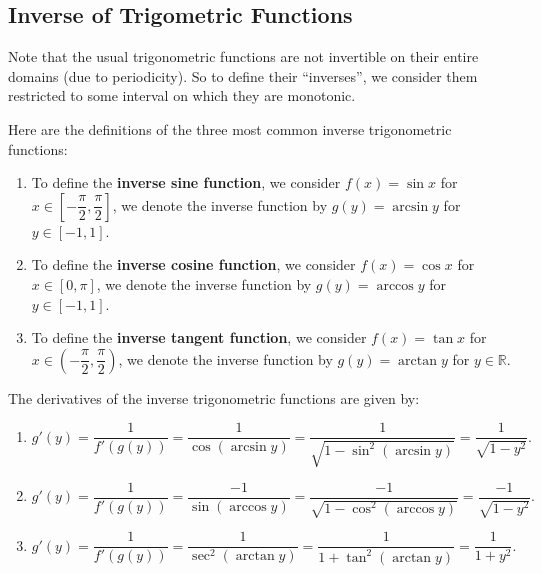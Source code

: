 \documentclass[a4paper]{ctexart}
\begin{document}
    \subsection{Inverse of Trigometric Functions}
    Note that the usual trigonometric functions are not invertible on their entire domains (due to periodicity).  So to define their ``inverses'', we consider them restricted to some interval on which they are monotonic.
    \begin{mydef}
        Here are the definitions of the three most common inverse trigonometric functions:
        \begin{enumerate}
            \item To define the \textbf{inverse sine function}, we consider $f(x)=\sin x$ for $x \in \left[-\dfrac{\pi}{2}, \dfrac{\pi}{2}\right]$, we denote the inverse function by $g(y)=\arcsin y$ for $y \in [-1,1]$.
            \item To define the \textbf{inverse cosine function}, we consider $f(x)=\cos x$ for $x \in [0, \pi]$, we denote the inverse function by $g(y)=\arccos y$ for $y \in [-1,1]$.
            \item To define the \textbf{inverse tangent function}, we consider $f(x)=\tan x$ for $x \in \left(-\dfrac{\pi}{2}, \dfrac{\pi}{2}\right)$, we denote the inverse function by $g(y)=\arctan y$ for $y \in \mathbb{R}$.
        \end{enumerate}
    \end{mydef}
    \begin{mythm}
        The derivatives of the inverse trigonometric functions are given by:
        \begin{enumerate}
            \item [(1)]
            \[
            g'(y) = \dfrac{1}{f'(g(y))} = \frac{1}{\cos(\arcsin y)} = \frac{1}{\sqrt{1-\sin^2(\arcsin y)}} = \frac{1}{\sqrt{1-y^2}}.
            \]
            \item [(2)]
            \[
            g'(y) = \dfrac{1}{f'(g(y))} = \frac{-1}{\sin(\arccos y)} = \frac{-1}{\sqrt{1-\cos^2(\arccos y)}} = \frac{-1}{\sqrt{1-y^2}}.
            \]
            \item [(3)]
            \[
            g'(y) = \dfrac{1}{f'(g(y))} = \frac{1}{\sec^2(\arctan y)} = \frac{1}{1+\tan^2(\arctan y)} = \frac{1}{1+y^2}.
            \]
        \end{enumerate}
    \end{mythm}
\end{document}
